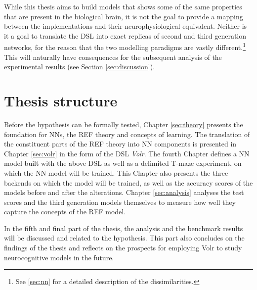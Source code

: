 \documentclass[report.tex]{subfiles}
\begin{document}
While this thesis aims to build models that shows some of the same
properties that are present in the biological brain,  
it is not the goal to provide a mapping between the
implementations and their neurophysiological equivalent.
Neither is it a goal to translate the \gls{DSL} into exact replicas
of second and third generation networks, for the reason that the
two modelling paradigms are vastly different.\footnote{See \ref{sec:nn}
for a detailed description of the dissimilarities.}
This will naturally have consequences for the subsequent analysis of the
experimental results (see Section \ref{sec:discussion}).

\section{Thesis structure}
Before the hypothesis can be formally tested, Chapter \ref{sec:theory}
presents the foundation for \gls{NN}s, the \gls{REF} theory and
concepts of learning.
The translation of the constituent parts of the \gls{REF} theory
into \gls{NN} components is presented in Chapter \ref{sec:volr} in 
the form of the \gls{DSL} \textit{Volr}. 
The fourth Chapter defines a \gls{NN} model built with the above
\gls{DSL} as well as a delimited T-maze experiment, on which the 
\gls{NN} model will be trained.
This Chapter also presents the three \gls{backend}s on which the 
model will be trained, as well as the accuracy scores of the models
before and after the alterations.
Chapter \ref{sec:analysis} analyses the test scores and the third 
generation models themselves to measure how well they capture the
concepts of the \gls{REF} model.

In the fifth and final part of the thesis, the analysis and the benchmark
results will be discussed and related to the hypothesis.
This part also concludes on the findings of the thesis and
reflects on the prospects for employing Volr to study neurocognitive
models in the future.
\end{document}
